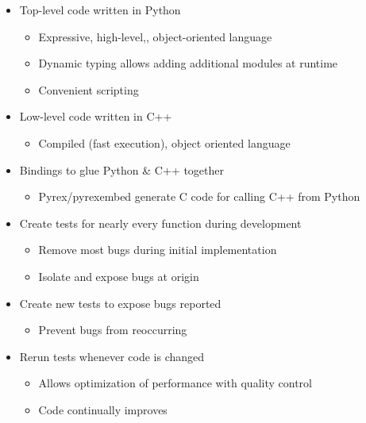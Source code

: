 \documentclass[pdftex,cig,slideColor]{pp4slides}
\begin{document}

  \begin{itemize}
  \item Top-level code written in Python
    \begin{itemize}
    \item Expressive, high-level,, object-oriented language
    \item Dynamic typing allows adding additional modules at runtime
    \item Convenient scripting
    \end{itemize}
  \item Low-level code written in C++
    \begin{itemize}
    \item Compiled (fast execution), object oriented language
    \end{itemize}
  \item Bindings to glue Python \& C++ together
    \begin{itemize}
    \item Pyrex/pyrexembed generate C code for calling C++ from Python
    \end{itemize}
  \end{itemize}

 
 \begin{itemize}
 \item Create tests for nearly every function during development
   \begin{itemize}
   \item Remove most bugs during initial implementation
   \item Isolate and expose bugs at origin
   \end{itemize}
 \item Create new tests to expose bugs reported
   \begin{itemize}
   \item Prevent bugs from reoccurring
   \end{itemize}
 \item Rerun tests whenever code is changed
   \begin{itemize}
   \item Allows optimization of performance with quality control
   \item Code continually improves
   \end{itemize}
 \end{itemize}
  
\end{document}

